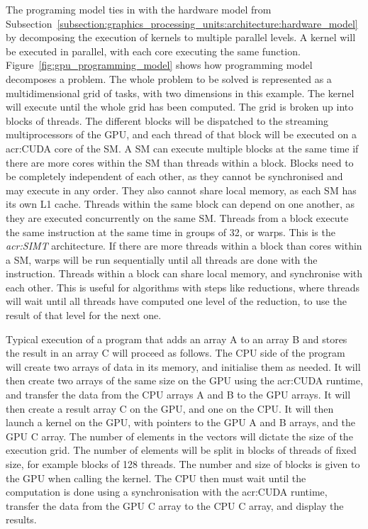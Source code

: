 The programing model ties in with the hardware model from
Subsection~\ref{subsection:graphics_processing_units:architecture:hardware_model} by decomposing the
execution of kernels to multiple parallel levels. A kernel will be executed in parallel, with each
core executing the same function. Figure~\ref{fig:gpu_programming_model} shows how programming model
decomposes a problem. The whole problem to be solved is represented as a multidimensional grid of
tasks, with two dimensions in this example. The kernel will execute until the whole grid has been
computed. The grid is broken up into blocks of threads. The different blocks will be dispatched to
the streaming multiprocessors of the GPU, and each thread of that block will be executed on a
\acrshort{acr:CUDA} core of the SM. A SM can execute multiple blocks at the same time if there are
more cores within the SM than threads within a block. Blocks need to be completely independent of
each other, as they cannot be synchronised and may execute in any order. They also cannot share
local memory, as each SM has its own L1 cache. Threads within the same block can depend on one
another, as they are executed concurrently on the same SM. Threads from a block execute the same
instruction at the same time in groups of 32, or warps. This is the \textit{\acrfull{acr:SIMT}}
architecture. If there are more threads within a block than cores within a SM, warps will be run
sequentially until all threads are done with the instruction. Threads within a block can share local
memory, and synchronise with each other. This is useful for algorithms with steps like reductions,
where threads will wait until all threads have computed one level of the reduction, to use the
result of that level for the next one.

Typical execution of a program that adds an array A to an array B and stores the result in an array
C will proceed as follows. The CPU side of the program will create two arrays of data in its memory,
and initialise them as needed. It will then create two arrays of the same size on the GPU using the
\acrshort{acr:CUDA} runtime, and transfer the data from the CPU arrays A and B to the GPU arrays. It
will then create a result array C on the GPU, and one on the CPU. It will then launch a kernel on
the GPU, with pointers to the GPU A and B arrays, and the GPU C array. The number of elements in the
vectors will dictate the size of the execution grid. The number of elements will be split in blocks
of threads of fixed size, for example blocks of 128 threads. The number and size of blocks is given
to the GPU when calling the kernel. The CPU then must wait until the computation is done using a
synchronisation with the \acrshort{acr:CUDA} runtime, transfer the data from the GPU C array to the
CPU C array, and display the results. 

